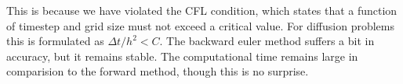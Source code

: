 \documentclass{article}
\begin{document}
This is because we have violated the CFL condition, which states that a function of timestep and grid size must not exceed a critical value.
For diffusion problems this is formulated as $\Delta t  / h^2 < C$.
The backward euler method suffers a bit in accuracy, but it remains stable.
The computational time remains large in comparision to the forward method, though this is no surprise.


% 
\end{document}
